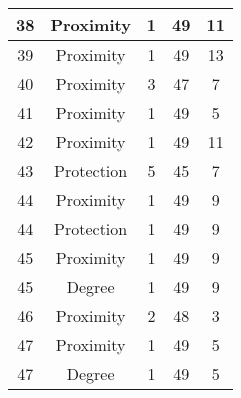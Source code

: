 \documentclass[results.tex]{subfiles}
\begin{document}
\begin{center}
\begin{tabular}{| c || c | c | c | c |}
            \hline
            38                      & Proximity                    & 1                      & 49                      & 11                   \\
            \hline
            39                      & Proximity                    & 1                      & 49                      & 13                   \\
            \hline
            40                      & Proximity                    & 3                      & 47                      & 7                    \\
            \hline
            41                      & Proximity                    & 1                      & 49                      & 5                    \\
            \hline
            42                      & Proximity                    & 1                      & 49                      & 11                   \\
            \hline
            43                      & Protection                   & 5                      & 45                      & 7                    \\
            \hline
            44                      & Proximity                    & 1                      & 49                      & 9                    \\
            \hline
            44                      & Protection                   & 1                      & 49                      & 9                    \\
            \hline
            45                      & Proximity                    & 1                      & 49                      & 9                    \\
            \hline
            45                      & Degree                       & 1                      & 49                      & 9                    \\
            \hline
            46                      & Proximity                    & 2                      & 48                      & 3                    \\
            \hline
            47                      & Proximity                    & 1                      & 49                      & 5                    \\
            \hline
            47                      & Degree                       & 1                      & 49                      & 5                    \\

\end{tabular}
\end{center}
\end{document}
